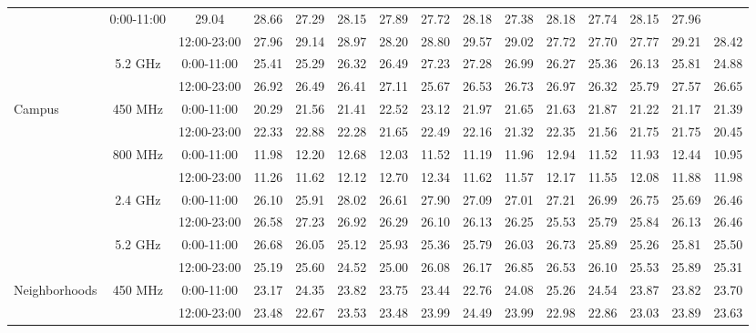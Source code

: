 \begin{table}
\begin{tabular}{|l|c|c|c|c|c|c|c|c|c|c|c|c|c|c|}
&0:00-11:00 &  29.04 &  28.66 &  27.29 &  28.15 &  27.89 &  27.72&  28.18 &  27.38&  28.18 &  27.74&  28.15 &  27.96 \\ 	
\cline{3-15}	
&&12:00-23:00&  27.96 &  29.14 &  28.97 &  28.20 &  28.80 &  29.57&  29.02 &  27.72&  27.70 &  27.77&  29.21 &  28.42 \\ 	
\cline{2-15}	
&\multirow{2}{*}{5.2 GHz}	
&0:00-11:00 &  25.41 &  25.29 &  26.32 &  26.49 &  27.23 &  27.28&  26.99 &  26.27&  25.36 &  26.13&  25.81 &  24.88 \\ 	
\cline{3-15}	
&&12:00-23:00&  26.92 &  26.49 &  26.41 &  27.11 &  25.67 &  26.53&  26.73 &  26.97&  26.32 &  25.79&  27.57 &  26.65 \\ 	
\hline	
\multirow{8}{*}{Campus}	
&\multirow{2}{*}{450 MHz}	
&0:00-11:00 &  20.29 &  21.56 &  21.41 &  22.52 &  23.12 &  21.97&  21.65 &  21.63&  21.87 &  21.22&  21.17 &  21.39 \\ 	
\cline{3-15}	
&&12:00-23:00&  22.33 &  22.88 &  22.28 &  21.65 &  22.49 &  22.16&  21.32 &  22.35&  21.56 &  21.75&  21.75 &  20.45 \\ 	
\cline{2-15}	
&\multirow{2}{*}{800 MHz}	
&0:00-11:00 &  11.98 &  12.20 &  12.68 &  12.03 &  11.52 &  11.19&  11.96 &  12.94&  11.52 &  11.93&  12.44 &  10.95 \\ 	
\cline{3-15}	
&&12:00-23:00&  11.26 &  11.62 &  12.12 &  12.70 &  12.34 &  11.62&  11.57 &  12.17&  11.55 &  12.08&  11.88 &  11.98 \\ 	
\cline{2-15}	
&\multirow{2}{*}{2.4 GHz}	
&0:00-11:00 &  26.10 &  25.91 &  28.02 &  26.61 &  27.90 &  27.09&  27.01 &  27.21&  26.99 &  26.75&  25.69 &  26.46 \\ 	
\cline{3-15}	
&&12:00-23:00&  26.58 &  27.23 &  26.92 &  26.29 &  26.10 &  26.13&  26.25 &  25.53&  25.79 &  25.84&  26.13 &  26.46 \\ 	
\cline{2-15}	
&\multirow{2}{*}{5.2 GHz}	
&0:00-11:00 &  26.68 &  26.05 &  25.12 &  25.93 &  25.36 &  25.79&  26.03 &  26.73&  25.89 &  25.26&  25.81 &  25.50 \\ 	
\cline{3-15}	
&&12:00-23:00&  25.19 &  25.60 &  24.52 &  25.00 &  26.08 &  26.17&  26.85 &  26.53&  26.10 &  25.53&  25.89 &  25.31 \\ 	
\hline	
\multirow{8}{*}{Neighborhoods}	
&\multirow{2}{*}{450 MHz}	
&0:00-11:00 &  23.17 &  24.35 &  23.82 &  23.75 &  23.44 &  22.76&  24.08 &  25.26&  24.54 &  23.87&  23.82 &  23.70 \\ 	
\cline{3-15}	
&&12:00-23:00&  23.48 &  22.67 &  23.53 &  23.48 &  23.99 &  24.49&  23.99 &  22.98&  22.86 &  23.03&  23.89 &  23.63 \\ 	

\end{tabular}
\end{table}
